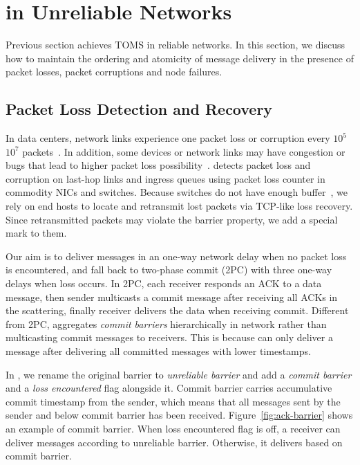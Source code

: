 \section{\sys in Unreliable Networks}
\label{sec:reliable}

Previous section achieves TOMS in reliable networks.
In this section, we discuss how to maintain the ordering and atomicity of message delivery in the presence of packet losses, packet corruptions and node failures.

\subsection{Packet Loss Detection and Recovery}
\label{sec:lossy}

In data centers, network links experience one packet loss or corruption every $10^5$ \texttildelow $10^7$ packets~\cite{zhuo2017understanding}.
In addition, some devices or network links may have congestion or bugs that lead to higher packet loss possibility~\cite{guo2015pingmesh}.
\sys detects packet loss and corruption on last-hop links and ingress queues using packet loss counter in commodity NICs and switches.
Because switches do not have enough buffer~\cite{bai2017congestion}, we rely on end hosts to locate and retransmit lost packets via TCP-like loss recovery.
Since retransmitted packets may violate the barrier property, we add a special mark to them.

Our aim is to deliver messages in an one-way network delay when no packet loss is encountered, and fall back to two-phase commit (2PC) with three one-way delays when loss occurs.
In 2PC, each receiver responds an ACK to a data message, then sender multicasts a commit message after receiving all ACKs in the scattering, finally receiver delivers the data when receiving commit.
Different from 2PC, \sys aggregates \textit{commit barriers} hierarchically in network rather than multicasting commit messages to receivers.
This is because \sys can only deliver a message after delivering all committed messages with lower timestamps.

In \sys, we rename the original barrier to \textit{unreliable barrier} and add a \textit{commit barrier} and a \textit{loss encountered} flag alongside it.
Commit barrier carries accumulative commit timestamp from the sender, which means that all messages sent by the sender and below commit barrier has been received.
Figure~\ref{fig:ack-barrier} shows an example of commit barrier.
When loss encountered flag is off, a receiver can deliver messages according to unreliable barrier.
Otherwise, it delivers based on commit barrier.

